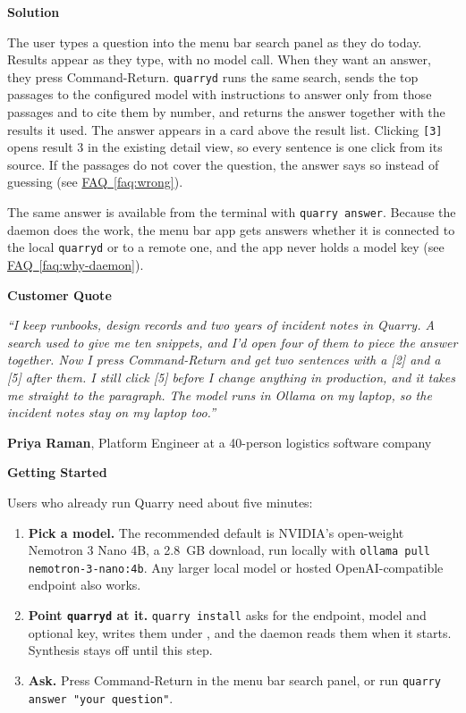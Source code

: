 \documentclass[11pt,letterpaper]{article}
\newcommand{\prsection}[1]{%
  \vspace{1em}%
  {\large\bfseries\color{SectionBlue}#1}%
  \vspace{0.3em}\par%
}
\newcommand{\faqref}[1]{\hyperref[#1]{FAQ~\ref*{#1}}}
\begin{document}
\prsection{Solution}

The user types a question into the menu bar search panel as they do today.
Results appear as they type, with no model call. When they want an answer, they
press Command-Return. \texttt{quarryd} runs the same search, sends the top
passages to the configured model with instructions to answer only from those
passages and to cite them by number, and returns the answer together with the
results it used. The answer appears in a card above the result list. Clicking
\texttt{[3]} opens result 3 in the existing detail view, so every sentence is
one click from its source. If the passages do not cover the question, the
answer says so instead of guessing (see \faqref{faq:wrong}).

The same answer is available from the terminal with
\texttt{quarry answer}. Because the daemon does the work, the menu bar
app gets answers whether it is connected to the local \texttt{quarryd} or to a
remote one, and the app never holds a model key (see \faqref{faq:why-daemon}).

\prsection{Customer Quote}

\begin{customerquote}
\textit{``I keep runbooks, design records and two years of incident notes in
Quarry. A search used to give me ten snippets, and I'd open four of them to
piece the answer together. Now I press Command-Return and get two sentences
with a [2] and a [5] after them. I still click [5] before I change anything in
production, and it takes me straight to the paragraph. The model runs in Ollama
on my laptop, so the incident notes stay on my laptop too.''}

\raggedleft \textbf{Priya Raman}, Platform Engineer at a 40-person logistics software company
\end{customerquote}

\prsection{Getting Started}

Users who already run Quarry need about five minutes:

\begin{enumerate}[leftmargin=2em]
  \item \textbf{Pick a model.} The recommended default is NVIDIA's
        open-weight Nemotron 3 Nano 4B, a 2.8~GB download, run locally with
        \texttt{ollama pull nemotron-3-nano:4b}. Any larger local model or hosted
        OpenAI-compatible endpoint also works.
  \item \textbf{Point \texttt{quarryd} at it.} \texttt{quarry install} asks
        for the endpoint, model and optional key, writes them under
        , and the daemon reads them
        when it starts. Synthesis stays off until this step.
  \item \textbf{Ask.} Press Command-Return in the menu bar search panel, or run
        \texttt{quarry answer "your question"}.
\end{enumerate}
\end{document}
